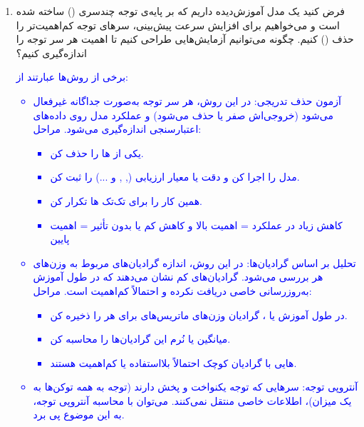 \documentclass[12pt]{article}
\begin{document}
\begin{enumerate}
\begin{enumerate}
            \item 	فرض کنید یک مدل آموزش‌دیده داریم که بر پایه‌ی توجه چندسری () ساخته شده است و می‌خواهیم برای افزایش سرعت پیش‌بینی، سرهای توجه کم‌اهمیت‌تر را حذف () کنیم. چگونه می‌توانیم آزمایش‌هایی طراحی کنیم تا اهمیت هر سر توجه را اندازه‌گیری کنیم؟
            
            \textcolor{blue}{
            برخی از روش‌ها عبارتند از:
            \begin{itemize}
                \item آزمون حذف تدریجی:
                در این روش، هر سر توجه به‌صورت جداگانه غیرفعال می‌شود (خروجی‌اش صفر یا حذف می‌شود) و عملکرد مدل روی داده‌های اعتبارسنجی اندازه‌گیری می‌شود.
                مراحل:
                \begin{itemize}
                    \item یکی از  ها را حذف کن.
                    \item مدل را اجرا کن و دقت یا معیار ارزیابی (, ,  و ...) را ثبت کن.
                    \item همین کار را برای تک‌تک  ها تکرار کن.
                    \item کاهش زیاد در عملکرد = اهمیت بالا و کاهش کم یا بدون تأثیر = اهمیت پایین
                \end{itemize}
                \item تحلیل بر اساس گرادیان‌ها:
                در این روش، اندازه گرادیان‌های مربوط به وزن‌های هر  بررسی می‌شود. گرادیان‌های کم نشان می‌دهند که  در طول آموزش به‌روزرسانی خاصی دریافت نکرده و احتمالاً کم‌اهمیت است. مراحل:
                \begin{itemize}
                    \item در طول آموزش یا ، گرادیان وزن‌های ماتریس‌های    برای هر   را ذخیره کن.
                    \item میانگین یا نُرم  این گرادیان‌ها را محاسبه کن.
                    \item {} هایی با گرادیان کوچک  احتمالاً  بلااستفاده یا کم‌اهمیت هستند.
                \end{itemize}
                \item آنتروپی توجه:
                سرهایی که توجه یکنواخت و پخش دارند (توجه به همه توکن‌ها به یک میزان)، اطلاعات خاصی منتقل نمی‌کنند. می‌توان با محاسبه آنتروپی  توجه، به این موضوع پی برد.

\end{itemize}}
\end{enumerate}
\end{enumerate}
\end{document}
